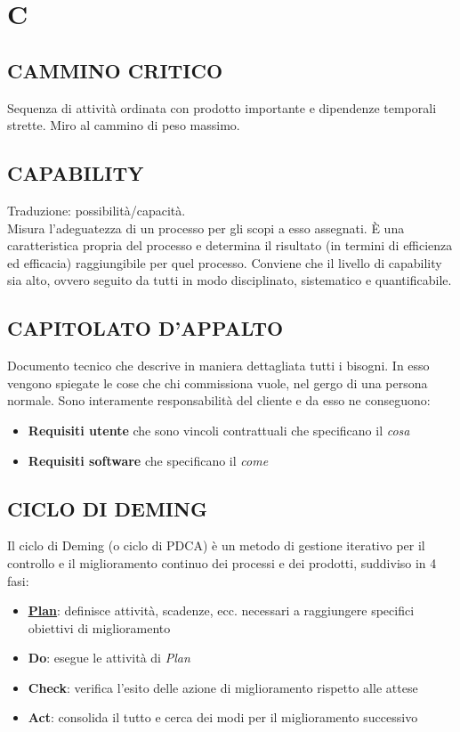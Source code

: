 \newpage
	\section{C} \label{sec:C}

		\subsection{CAMMINO CRITICO}  \label{camminocritico}
		Sequenza di attività ordinata con prodotto importante e dipendenze temporali strette. Miro al cammino di peso massimo.

		\subsection{CAPABILITY}	 \label{capability} %
		Traduzione: possibilità/capacità. \\
		Misura l’adeguatezza di un processo per gli scopi a esso assegnati. È una caratteristica propria del processo e  determina il risultato (in termini di efficienza ed efficacia) raggiungibile per quel processo. Conviene che il livello di capability sia alto, ovvero seguito da tutti in modo disciplinato, sistematico e quantificabile.

		\subsection{CAPITOLATO D'APPALTO}  \label{capitolati}
		Documento tecnico che descrive in maniera dettagliata tutti i bisogni. In esso vengono spiegate le cose che chi commissiona vuole, nel gergo di una persona normale. Sono interamente responsabilità del cliente e da esso ne conseguono:
			\begin{itemize}
				\item \textbf{Requisiti utente} che sono vincoli contrattuali che specificano il \textit{cosa}
				\item \textbf{Requisiti software} che specificano il \textit{come}
			\end{itemize}

		\subsection{CICLO DI DEMING}  \label{pdca}
		Il ciclo di Deming (o ciclo di PDCA) è un metodo di gestione iterativo per il controllo e il miglioramento continuo dei processi e dei prodotti, suddiviso in 4 fasi:
			\begin{itemize}
				\item \textbf{\underline{\hyperref[pianificazione]{Plan}}}: definisce attività, scadenze, ecc. necessari a raggiungere specifici obiettivi di miglioramento
				\item \textbf{Do}: esegue le attività di \textit{Plan}
				\item \textbf{Check}: verifica l'esito delle azione di miglioramento rispetto alle attese
				\item \textbf{Act}: consolida il tutto e cerca dei modi per il miglioramento successivo
			\end{itemize}

